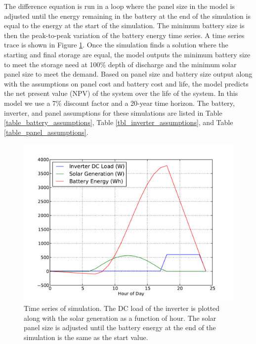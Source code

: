 \documentclass[conference]{IEEEtran}
\begin{document}
The difference equation is run in a loop where the
panel size in the model is adjusted until the energy remaining
in the battery at the end of the simulation is equal to the
energy at the start of the simulation.
The minimum battery size is then the peak-to-peak variation
of the battery energy time series.
A time series trace is shown in Figure \ref{simulation}.
Once the simulation finds a solution where the starting and final
storage are equal, the model outputs the minimum battery size
to meet the storage need at 100\% depth of discharge and the
minimum solar panel size to meet the demand.
Based on panel size and battery size output along with the
assumptions on panel cost and battery cost and life, the model
predicts the net present value (NPV) of the system over the
life of the system.
In this model we use a 7\% discount factor and a 20-year time
horizon.
The battery, inverter, and panel assumptions for these simulations are listed in
Table \ref{table_battery_assumptions},
Table \ref{tbl_inverter_assumptions},
and Table \ref{table_panel_assumptions}.

\begin{figure}[h]
\begin{center}
\includegraphics[trim = 0.0in 0.2in 0.0in 0.5in, clip, width=\columnwidth]
{figures/simulation.pdf}
\end{center}
\caption{
Time series of simulation.
The DC load of the inverter is plotted along with the solar generation
as a function of hour.
The solar panel size is adjusted until the battery energy at the end
of the simulation is the same as the start value.
}
\label{simulation}
\end{figure}
\end{document}
